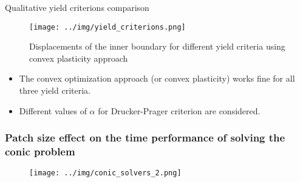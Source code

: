 \documentclass[9pt]{beamer}
\begin{document}
\begin{frame}{Qualitative yield criterions comparison}
  \begin{figure}[H]
    \center
    \texttt{[image: ../img/yield\_criterions.png]}
    \caption{Displacements of the inner boundary for different yield criteria using convex plasticity approach}
  \end{figure}

  \begin{itemize}
    \item The convex optimization approach (or convex plasticity) works fine for all three yield criteria.
    \item Different values of $\alpha$ for Drucker-Prager criterion are considered.
  \end{itemize}
\end{frame}

\begin{frame}
  \frametitle{Patch size effect on the time performance of solving the conic problem}
  \begin{figure}[H]
    \center
    \texttt{[image: ../img/conic\_solvers\_2.png]}
  \end{figure}
\end{frame}
\end{document}
